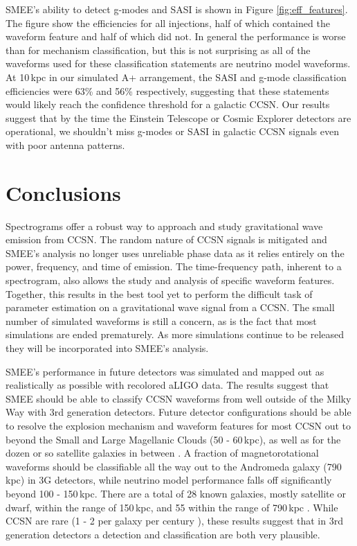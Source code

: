 \documentclass[letterpaper, aps, prd, twocolumn, superscriptaddress, showpacs, nofootinbib]{revtex4}
\begin{document}
SMEE's ability to detect g-modes and SASI is shown in Figure \ref{fig:eff_features}. The figure show the efficiencies for all injections, half of which contained the waveform feature and half of which did not. In general the performance is worse than for mechanism classification, but this is not surprising as all of the waveforms used for these classification statements are neutrino model waveforms. At 10\,kpc in our simulated A+ arrangement, the SASI and g-mode classification efficiencies were 63\% and 56\% respectively, suggesting that these statements would likely reach the confidence threshold for a galactic CCSN. Our results suggest that by the time the Einstein Telescope or Cosmic Explorer detectors are operational, we shouldn't miss g-modes or SASI in galactic CCSN signals even with poor antenna patterns. 

\section{Conclusions}
\label{sec:conclusion}

Spectrograms offer a robust way to approach and study gravitational wave emission from CCSN. The random nature of CCSN signals is mitigated and SMEE's analysis no longer uses unreliable phase data as it relies entirely on the power, frequency, and time of emission. The time-frequency path, inherent to a spectrogram, also allows the study and analysis of specific waveform features. Together, this results in the best tool yet to perform the difficult task of parameter estimation on a gravitational wave signal from a CCSN. The small number of simulated waveforms is still a concern, as is the fact that most simulations are ended prematurely. As more simulations continue to be released they will be incorporated into SMEE's analysis.

SMEE's performance in future detectors was simulated and mapped out as realistically as possible with recolored aLIGO data. The results suggest that SMEE should be able to classify CCSN waveforms from well outside of the Milky Way with 3rd generation detectors. Future detector configurations should be able to resolve the explosion mechanism and waveform features for most CCSN out to beyond the Small and Large Magellanic Clouds (50 - 60\,kpc), as well as for the dozen or so satellite galaxies in between \cite{karachentsev2004catalog, belokurov2007cats}. A fraction of magnetorotational waveforms should be classifiable all the way out to the Andromeda galaxy (790\,kpc) in 3G detectors, while neutrino model performance falls off significantly beyond 100 - 150\,kpc. There are a total of 28 known galaxies, mostly satellite or dwarf, within the range of 150\,kpc, and 55 within the range of 790\,kpc \cite{karachentsev2004catalog, belokurov2007cats}. While CCSN are rare (1 - 2 per galaxy per century \cite{1991ARA&A..29..363V, 1993A&A...273..383C, Alexeyev2002}), these results suggest that in 3rd generation detectors a detection and classification are both very plausible.
\end{document}
